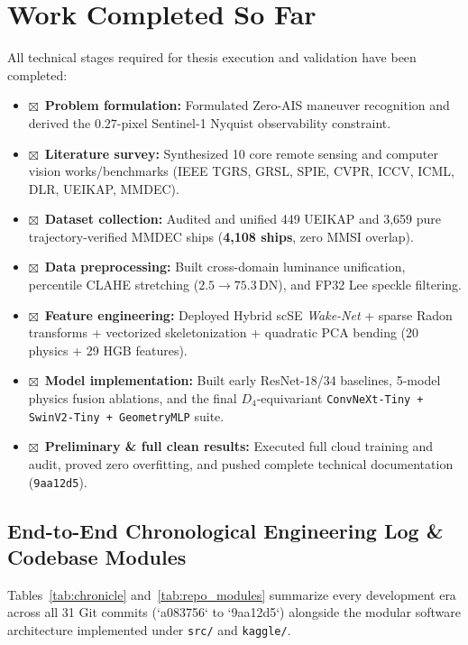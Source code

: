 \documentclass[11pt,a4paper]{article}
\newcommand{\checkedbox}{$\boxtimes$}
\begin{document}
\section{Work Completed So Far}

All technical stages required for thesis execution and validation have been completed:

\begin{itemize}[leftmargin=1.5em, label={}]
    \item \checkedbox\ \textbf{Problem formulation:} Formulated Zero-AIS maneuver recognition and derived the $0.27$-pixel Sentinel-1 Nyquist observability constraint.
    \item \checkedbox\ \textbf{Literature survey:} Synthesized 10 core remote sensing and computer vision works/benchmarks (IEEE TGRS, GRSL, SPIE, CVPR, ICCV, ICML, DLR, UEIKAP, MMDEC).
    \item \checkedbox\ \textbf{Dataset collection:} Audited and unified 449 UEIKAP and 3,659 pure trajectory-verified MMDEC ships (\textbf{4,108 ships}, zero MMSI overlap).
    \item \checkedbox\ \textbf{Data preprocessing:} Built cross-domain luminance unification, percentile CLAHE stretching ($2.5\rightarrow 75.3$\,DN), and FP32 Lee speckle filtering.
    \item \checkedbox\ \textbf{Feature engineering:} Deployed Hybrid scSE \textit{Wake-Net} + sparse Radon transforms + vectorized skeletonization + quadratic PCA bending (20 physics + 29 HGB features).
    \item \checkedbox\ \textbf{Model implementation:} Built early ResNet-18/34 baselines, 5-model physics fusion ablations, and the final $D_4$-equivariant \texttt{ConvNeXt-Tiny + SwinV2-Tiny + GeometryMLP} suite.
    \item \checkedbox\ \textbf{Preliminary \& full clean results:} Executed full cloud training and audit, proved zero overfitting, and pushed complete technical documentation (\texttt{9aa12d5}).
\end{itemize}

\subsection{End-to-End Chronological Engineering Log \& Codebase Modules}
Tables~\ref{tab:chronicle} and~\ref{tab:repo_modules} summarize every development era across all 31 Git commits (`a083756` to `9aa12d5`) alongside the modular software architecture implemented under \texttt{src/} and \texttt{kaggle/}.
\end{document}
